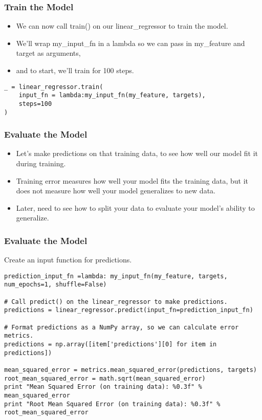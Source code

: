 \begin{frame}[fragile]\frametitle{Train the Model}
\begin{itemize}
\item We can now call train() on our linear\_regressor to train the model. 
\item We'll wrap my\_input\_fn in a lambda so we can pass in my\_feature and target as arguments, 
\item and to start, we'll train for 100 steps.
\end{itemize}

\begin{lstlisting}
_ = linear_regressor.train(
    input_fn = lambda:my_input_fn(my_feature, targets),
    steps=100
)
\end{lstlisting}

\end{frame}

\begin{frame}[fragile]\frametitle{Evaluate the Model}
\begin{itemize}
\item Let's make predictions on that training data, to see how well our model fit it during training.
\item Training error measures how well your model fits the training data, but it does not measure how well your model generalizes to new data. 
\item Later, need to see how to split your data to evaluate your model's ability to generalize.
\end{itemize}
\end{frame}

\begin{frame}[fragile]\frametitle{Evaluate the Model}
 Create an input function for predictions.
\begin{lstlisting}
prediction_input_fn =lambda: my_input_fn(my_feature, targets, num_epochs=1, shuffle=False)

# Call predict() on the linear_regressor to make predictions.
predictions = linear_regressor.predict(input_fn=prediction_input_fn)

# Format predictions as a NumPy array, so we can calculate error metrics.
predictions = np.array([item['predictions'][0] for item in predictions])

mean_squared_error = metrics.mean_squared_error(predictions, targets)
root_mean_squared_error = math.sqrt(mean_squared_error)
print "Mean Squared Error (on training data): %0.3f" % mean_squared_error
print "Root Mean Squared Error (on training data): %0.3f" % root_mean_squared_error
\end{lstlisting}

\end{frame}

